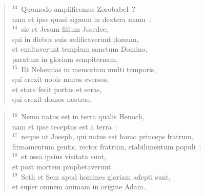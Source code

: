 \begin{flushleft}\begin{verse}${}^{13}$~Quomodo amplificemus Zorobabel~?\\ nam et ipse quasi signum in dextera manu~:\\
${}^{14}$~sic et Jesum filium Josedec,\\ qui in diebus suis \ae dificaverunt domum,\\ et exaltaverunt templum sanctum Domino,\\ paratum in gloriam sempiternam.\\
${}^{15}$~Et Nehemias in memoriam multi temporis,\\ qui erexit nobis muros eversos,\\ et stare fecit portas et seras,\\ qui erexit domos nostras.\end{verse}\end{flushleft}


\begin{flushleft}\begin{verse}${}^{16}$~Nemo natus est in terra qualis Henoch,\\ nam et ipse receptus est a terra~:\\
${}^{17}$~neque ut Joseph, qui natus est homo princeps fratrum,\\ firmamentum gentis, rector fratrum, stabilimentum populi~:\\
${}^{18}$~et ossa ipsius visitata sunt,\\ et post mortem prophetaverunt.\\
${}^{19}$~Seth et Sem apud homines gloriam adepti sunt,\\ et super omnem animam in origine Adam.\end{verse}\end{flushleft}


